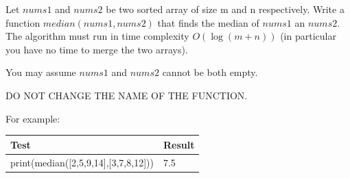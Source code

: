 \documentclass[10pt,a4paper]{article}
\begin{document}
Let $nums1$ and $nums2$ be two sorted array of size m and n respectively. Write a function $median(nums1,nums2)$ that finds the median of $nums1$ an $nums2$. The algorithm must run in time complexity $O(\log (m+n))$ (in particular you have no time to merge the two arrays).

You may assume $nums1$ and $nums2$ cannot be both empty.

DO NOT CHANGE THE NAME OF THE FUNCTION.

For example:
\begin{center}
\begin{tabular}{| l | l |}
\hline
Test	 &Result\\
\hline
print(median([2,5,9,14],[3,7,8,12]))& 7.5\\
\hline
\end{tabular}
\end{center}
\end{document}
